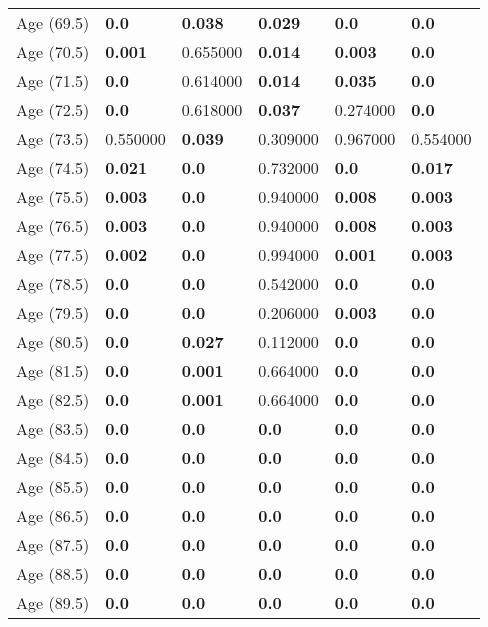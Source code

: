 \begin{tabular}{llllll}
Age (69.5) & \textbf{0.0} & \textbf{0.038} & \textbf{0.029} & \textbf{0.0} & \textbf{0.0} \\
Age (70.5) & \textbf{0.001} & 0.655000 & \textbf{0.014} & \textbf{0.003} & \textbf{0.0} \\
Age (71.5) & \textbf{0.0} & 0.614000 & \textbf{0.014} & \textbf{0.035} & \textbf{0.0} \\
Age (72.5) & \textbf{0.0} & 0.618000 & \textbf{0.037} & 0.274000 & \textbf{0.0} \\
Age (73.5) & 0.550000 & \textbf{0.039} & 0.309000 & 0.967000 & 0.554000 \\
Age (74.5) & \textbf{0.021} & \textbf{0.0} & 0.732000 & \textbf{0.0} & \textbf{0.017} \\
Age (75.5) & \textbf{0.003} & \textbf{0.0} & 0.940000 & \textbf{0.008} & \textbf{0.003} \\
Age (76.5) & \textbf{0.003} & \textbf{0.0} & 0.940000 & \textbf{0.008} & \textbf{0.003} \\
Age (77.5) & \textbf{0.002} & \textbf{0.0} & 0.994000 & \textbf{0.001} & \textbf{0.003} \\
Age (78.5) & \textbf{0.0} & \textbf{0.0} & 0.542000 & \textbf{0.0} & \textbf{0.0} \\
Age (79.5) & \textbf{0.0} & \textbf{0.0} & 0.206000 & \textbf{0.003} & \textbf{0.0} \\
Age (80.5) & \textbf{0.0} & \textbf{0.027} & 0.112000 & \textbf{0.0} & \textbf{0.0} \\
Age (81.5) & \textbf{0.0} & \textbf{0.001} & 0.664000 & \textbf{0.0} & \textbf{0.0} \\
Age (82.5) & \textbf{0.0} & \textbf{0.001} & 0.664000 & \textbf{0.0} & \textbf{0.0} \\
Age (83.5) & \textbf{0.0} & \textbf{0.0} & \textbf{0.0} & \textbf{0.0} & \textbf{0.0} \\
Age (84.5) & \textbf{0.0} & \textbf{0.0} & \textbf{0.0} & \textbf{0.0} & \textbf{0.0} \\
Age (85.5) & \textbf{0.0} & \textbf{0.0} & \textbf{0.0} & \textbf{0.0} & \textbf{0.0} \\
Age (86.5) & \textbf{0.0} & \textbf{0.0} & \textbf{0.0} & \textbf{0.0} & \textbf{0.0} \\
Age (87.5) & \textbf{0.0} & \textbf{0.0} & \textbf{0.0} & \textbf{0.0} & \textbf{0.0} \\
Age (88.5) & \textbf{0.0} & \textbf{0.0} & \textbf{0.0} & \textbf{0.0} & \textbf{0.0} \\
Age (89.5) & \textbf{0.0} & \textbf{0.0} & \textbf{0.0} & \textbf{0.0} & \textbf{0.0} \\

\end{tabular}
